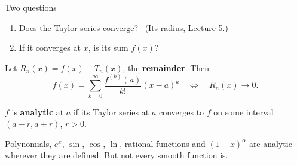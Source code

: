 \documentclass[10pt]{wosm-slides}
\begin{document}
\begin{frame}{Two questions}
  \begin{enumerate}
    \item Does the Taylor series converge? \ (Its radius, Lecture 5.)
    \item If it converges at $x$, is its sum $f(x)$?
  \end{enumerate}
  \pause
  Let $R_n(x) = f(x) - T_n(x)$, the \textbf{remainder}. Then
  \[ f(x) = \sum_{k=0}^\infty \frac{f^{(k)}(a)}{k!} (x - a)^k
     \quad\iff\quad R_n(x) \to 0 . \]
  \pause
  \begin{definition}
    $f$ is \textbf{analytic} at $a$ if its Taylor series at $a$ converges to $f$ on some
    interval $(a - r, a + r)$, $r > 0$.
  \end{definition}
  Polynomials, $e^x$, $\sin$, $\cos$, $\ln$, rational functions and $(1+x)^\alpha$ are analytic
  wherever they are defined. But not every smooth function is.
\end{frame}
\end{document}
